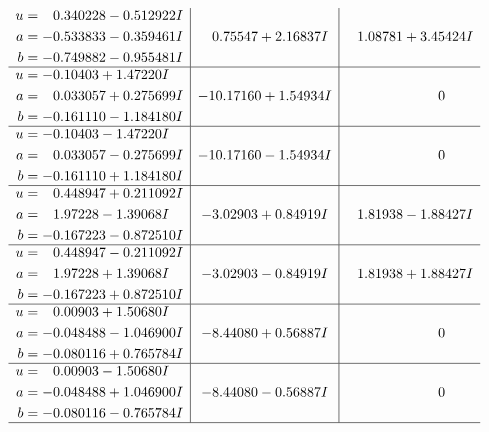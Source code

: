 \documentclass[1p]{elsarticle_modified}
\theoremstyle{definition}
\begin{document}
$$\begin{array}{c|c|c}
\begin{aligned}
u &= \phantom{-}0.340228 - 0.512922 I \\
a &= -0.533833 - 0.359461 I \\
b &= -0.749882 - 0.955481 I\end{aligned}
 & \phantom{-}0.75547 + 2.16837 I & \phantom{-}1.08781 + 3.45424 I \\ \hline\begin{aligned}
u &= -0.10403 + 1.47220 I \\
a &= \phantom{-}0.033057 + 0.275699 I \\
b &= -0.161110 - 1.184180 I\end{aligned}
 & -10.17160 + 1.54934 I & \phantom{-0.000000 } 0 \\ \hline\begin{aligned}
u &= -0.10403 - 1.47220 I \\
a &= \phantom{-}0.033057 - 0.275699 I \\
b &= -0.161110 + 1.184180 I\end{aligned}
 & -10.17160 - 1.54934 I & \phantom{-0.000000 } 0 \\ \hline\begin{aligned}
u &= \phantom{-}0.448947 + 0.211092 I \\
a &= \phantom{-}1.97228 - 1.39068 I \\
b &= -0.167223 - 0.872510 I\end{aligned}
 & -3.02903 + 0.84919 I & \phantom{-}1.81938 - 1.88427 I \\ \hline\begin{aligned}
u &= \phantom{-}0.448947 - 0.211092 I \\
a &= \phantom{-}1.97228 + 1.39068 I \\
b &= -0.167223 + 0.872510 I\end{aligned}
 & -3.02903 - 0.84919 I & \phantom{-}1.81938 + 1.88427 I \\ \hline\begin{aligned}
u &= \phantom{-}0.00903 + 1.50680 I \\
a &= -0.048488 - 1.046900 I \\
b &= -0.080116 + 0.765784 I\end{aligned}
 & -8.44080 + 0.56887 I & \phantom{-0.000000 } 0 \\ \hline\begin{aligned}
u &= \phantom{-}0.00903 - 1.50680 I \\
a &= -0.048488 + 1.046900 I \\
b &= -0.080116 - 0.765784 I\end{aligned}
 & -8.44080 - 0.56887 I & \phantom{-0.000000 } 0\\
 \hline 
 \end{array}$$\newpage\newpage\renewcommand{\arraystretch}{1}
\end{document}
